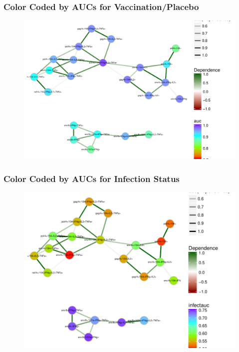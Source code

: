 \documentclass{beamer}
\makeatletter
\def\maxwidth{ %
  \ifdim\Gin@nat@width>\linewidth
    \linewidth
  \else
    \Gin@nat@width
  \fi
}
\theoremstyle{definition}
\makeatother
\begin{document}
\begin{frame}
\frametitle{Color Coded by AUCs for Vaccination/Placebo}
\begin{figure}[]
\includegraphics[width=\maxwidth]{figures/twoComponentVaccine}
\end{figure}
\end{frame}


\begin{frame}
\frametitle{Color Coded by AUCs for Infection Status}
\begin{figure}[]
\includegraphics[width=\maxwidth]{figures/twoComponentInfect}
\end{figure}
\end{frame}

\end{document}

